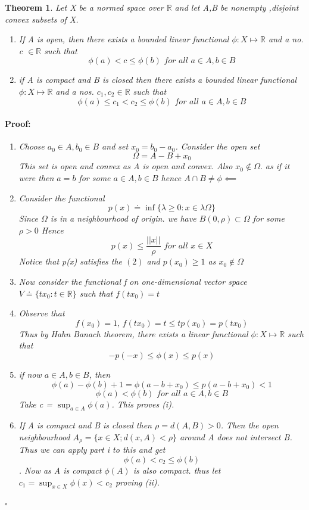 \documentclass{article}
\newenvironment{proof}{\paragraph{Proof:}}{\hfill$\square$}
\newtheorem{theorem}{Theorem}[section]
\begin{document}
\begin{theorem}
    Let X be a normed space over $\mathbb{R} $ and let A,B be nonempty ,disjoint convex subsets of X.
    \begin{enumerate}
        \item[(\textbf{i})] If A is open, then there exists a bounded linear functional $\phi :X \mapsto \mathbb{R}$ and a no. c $\in \mathbb{R}$ such that $$\phi (a) < c\leq \phi (b) \textit{                     for all $a\in A,b\in B$}  $$ 
        \item[(\textbf{ii})] if A is compact and B is closed then there exists a bounded linear functional $\phi :X \mapsto \mathbb{R}$ and a nos.  $c_1,c_2 \in \mathbb{R}$ such that $$\phi (a) \leq c_1<c_2 \leq \phi (b) \textit{                     for all $a\in A,b\in B$}  $$  
    \end{enumerate}
\begin{proof}
    \begin{enumerate}
        \item Choose $a_0 \in A, b_0 \in B$ and set $x_0=b_0-a_0$. Consider the open set $$\Omega=A-B+x_0$$
        This set is open and convex as A is open and convex. Also $x_0\notin \Omega .$ as if it were then $a=b $  for some $a\in A,b \in B$ hence $A\cap B\not= \phi \impliedby$

        
        
        
        
        \item Consider the functional $$   p(x)\doteq \inf \{\lambda \geq 0: x \in\lambda \Omega\}$$ Since $\Omega $  is in a neighbourhood of origin. we have $B(0,\rho) \subset \Omega$ for some $\rho >0$ 
    Hence $$p(x)\leq \frac{||x||}{\rho } \textit{       for all x$\in X$}$$
Notice that p(x) satisfies the $(2)$ and $p(x_0)\geq 1$ as $x_0 \notin \Omega$
        \item  Now consider the functional f on one-dimensional vector space $V\doteq \{ tx_0 : t \in\mathbb{R}\}$ such that $f(tx_0)=t$
        \item Observe that $$f(x_0)=1 \textit{,       } f(tx_0)=t\leq tp(x_0)=p(tx_0)$$
        Thus by Hahn Banach theorem, there exists a linear functional $\phi: X \mapsto \mathbb{R}$ such that $$-p(-x)\leq\phi(x)\leq p(x)$$
        \item if now $a\in A,b\in B$, then $$\phi(a)-\phi(b)+1=\phi(a-b+x_0)\leq p(a-b+x_0)<1$$
        $$\phi(a)<\phi(b)  \textit{                  for all $a\in A,b\in B$}$$
        Take c = $\sup_{a\in A} \phi(a)$. This proves (i).
        \item If A is compact and B is closed then $\rho=d(A,B)>0$. Then the open neighbourhood $A_{\rho} = \{ x\in X; d(x,A)<\rho\}$ around A does not intersect B. Thus we can apply part i to this and get $$\phi(a)<c_2\leq \phi(b) $$.
        Now as A is compact $\phi(A)$ is also compact. thus let $c_1= \sup_{x\in X} \phi(x) <c_2$ proving (ii).



    \end{enumerate}
\end{proof}
\end{theorem}
\end{document}
